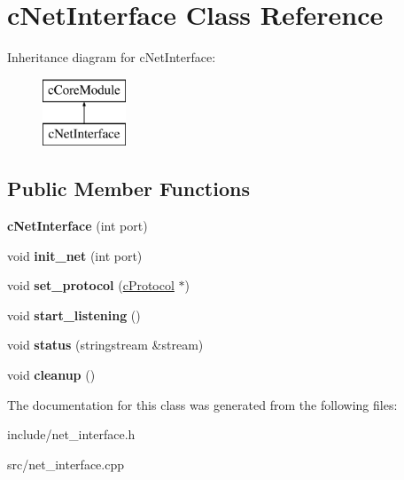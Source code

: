 \hypertarget{classcNetInterface}{\section{c\-Net\-Interface \-Class \-Reference}
\label{da/de4/classcNetInterface}
}
\-Inheritance diagram for c\-Net\-Interface\-:\begin{figure}[H]
\begin{center}
\leavevmode
\includegraphics[height=2.000000cm]{da/de4/classcNetInterface}
\end{center}
\end{figure}
\subsection*{\-Public \-Member \-Functions}
\begin{DoxyCompactItemize}
\item 
\hypertarget{classcNetInterface_a7b38cb9a362e729b8ef73245f9991fc2}{{\bfseries c\-Net\-Interface} (int port)}\label{da/de4/classcNetInterface_a7b38cb9a362e729b8ef73245f9991fc2}

\item 
\hypertarget{classcNetInterface_acea432f78242bb6edcb8f81a30114d1e}{void {\bfseries init\-\_\-net} (int port)}\label{da/de4/classcNetInterface_acea432f78242bb6edcb8f81a30114d1e}

\item 
\hypertarget{classcNetInterface_ad50e432a498ed9d24a58ef0390bbd983}{void {\bfseries set\-\_\-protocol} (\hyperlink{classcProtocol}{c\-Protocol} $\ast$)}\label{da/de4/classcNetInterface_ad50e432a498ed9d24a58ef0390bbd983}

\item 
\hypertarget{classcNetInterface_ab732d7b5c74093909877a2b4447cb9b2}{void {\bfseries start\-\_\-listening} ()}\label{da/de4/classcNetInterface_ab732d7b5c74093909877a2b4447cb9b2}

\item 
\hypertarget{classcNetInterface_a1005c326968e4e1cff622200a434d329}{void {\bfseries status} (stringstream \&stream)}\label{da/de4/classcNetInterface_a1005c326968e4e1cff622200a434d329}

\item 
\hypertarget{classcNetInterface_a29518e90ddc07c2ba44e6df688af0fe7}{void {\bfseries cleanup} ()}\label{da/de4/classcNetInterface_a29518e90ddc07c2ba44e6df688af0fe7}

\end{DoxyCompactItemize}


\-The documentation for this class was generated from the following files\-:\begin{DoxyCompactItemize}
\item 
include/net\-\_\-interface.\-h\item 
src/net\-\_\-interface.\-cpp\end{DoxyCompactItemize}
